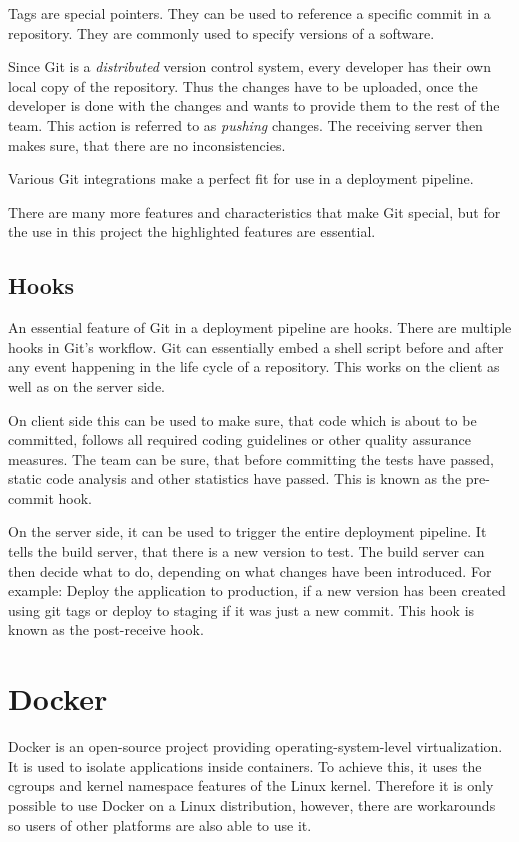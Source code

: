 Tags are special pointers. They can be used to reference a specific commit in a
repository. They are commonly used to specify versions of a software.

Since Git is a \textit{distributed} version control system, every developer has
their own local copy of the repository. Thus the changes have to be uploaded,
once the developer is done with the changes and wants to provide them to the
rest of the team. This action is referred to as \textit{pushing} changes. The
receiving server then makes sure, that there are no inconsistencies. \cite{git}

Various Git integrations make a perfect fit for use in a deployment
pipeline.

There are many more features and characteristics that make Git special, but for
the use in this project the highlighted features are essential.

\subsection{Hooks}

An essential feature of Git in a deployment pipeline are hooks. There are
multiple hooks in Git's workflow. Git can essentially embed a shell script
before and after any event happening in the life cycle of a repository. This
works on the client as well as on the server side.

On client side this can be used to make sure, that code which is about to be
committed, follows all required coding guidelines or other quality assurance
measures. The team can be sure, that before committing the tests have passed,
static code analysis and other statistics have passed. This is known as the
pre-commit hook.

On the server side, it can be used to trigger the entire deployment pipeline.
It tells the build server, that there is a new version to test. The build
server can then decide what to do, depending on what changes have been
introduced. For example: Deploy the application to production, if a new version
has been created using git tags or deploy to staging if it was just a new
commit. This hook is known as the post-receive hook. \cite{git}

\section{Docker}

Docker is an open-source project providing operating-system-level
virtualization. It is used to isolate applications inside containers. To
achieve this, it uses the cgroups and kernel namespace features of the Linux
kernel. Therefore it is only possible to use Docker on a Linux distribution,
however, there are workarounds so users of other platforms are also able to
use it.

